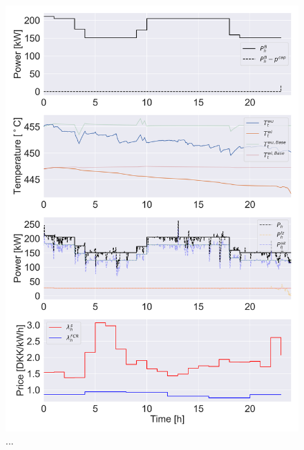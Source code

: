 \documentclass[lettersize,journal]{IEEEtran}
\begin{document}
\begin{figure}[!t]
    \centering
    \includegraphics[width=\columnwidth]{figures/fcr_single_case.png}
    \caption{...}
    \label{fig:fcr_single_case}
\end{figure}




% 







\end{document}
